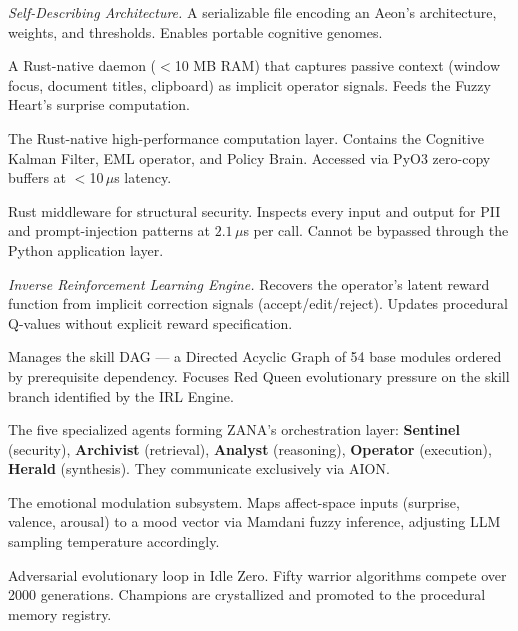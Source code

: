 \documentclass[12pt,a4paper]{article}
\begin{document}
\begin{description}[leftmargin=3cm, style=nextline, font=\bfseries\color{xblue}]
  \item[SDA / DNA]
    \emph{Self-Describing Architecture.} A serializable file encoding an Aeon's
    architecture, weights, and thresholds. Enables portable cognitive genomes.

  \item[Shadow Observer]
    A Rust-native daemon ($<$10 MB RAM) that captures passive context (window
    focus, document titles, clipboard) as implicit operator signals. Feeds the
    Fuzzy Heart's surprise computation.

  \item[Steel Core]
    The Rust-native high-performance computation layer. Contains the Cognitive
    Kalman Filter, EML operator, and Policy Brain. Accessed via PyO3 zero-copy
    buffers at $<$10\,$\mu$s latency.

  \item[Armor]
    Rust middleware for structural security. Inspects every input and output
    for PII and prompt-injection patterns at $2.1\,\mu$s per call.
    Cannot be bypassed through the Python application layer.

  \item[IRL Engine]
    \emph{Inverse Reinforcement Learning Engine.} Recovers the operator's latent
    reward function from implicit correction signals (accept/edit/reject).
    Updates procedural Q-values without explicit reward specification.

  \item[Curriculum Manager]
    Manages the skill DAG --- a Directed Acyclic Graph of 54 base modules
    ordered by prerequisite dependency. Focuses Red Queen evolutionary pressure
    on the skill branch identified by the IRL Engine.

  \item[Apex Quintet]
    The five specialized agents forming ZANA's orchestration layer:
    \textbf{Sentinel} (security), \textbf{Archivist} (retrieval),
    \textbf{Analyst} (reasoning), \textbf{Operator} (execution),
    \textbf{Herald} (synthesis). They communicate exclusively via AION.

  \item[Fuzzy Heart]
    The emotional modulation subsystem. Maps affect-space inputs
    (surprise, valence, arousal) to a mood vector via Mamdani fuzzy inference,
    adjusting LLM sampling temperature accordingly.

  \item[Red Queen Tournament]
    Adversarial evolutionary loop in Idle Zero. Fifty warrior algorithms
    compete over 2000 generations. Champions are crystallized and promoted
    to the procedural memory registry.

\end{description}
\end{document}
